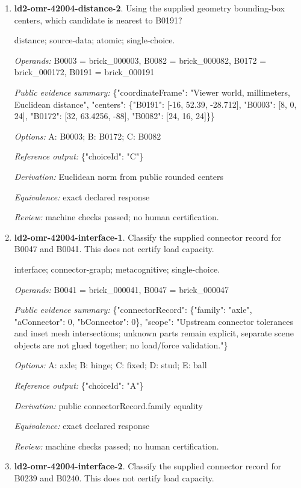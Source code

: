 \begin{enumerate}
\item \textbf{ld2-omr-42004-distance-2}. Using the supplied geometry bounding-box centers, which candidate is nearest to B0191?
\par{\small distance; source-data; atomic; single-choice.\par\textit{Operands:} B0003 = brick\_000003, B0082 = brick\_000082, B0172 = brick\_000172, B0191 = brick\_000191\par\textit{Public evidence summary:} \{"coordinateFrame": "Viewer world, millimeters, Euclidean distance", "centers": \{"B0191": [-16, 52.39, -28.712], "B0003": [8, 0, 24], "B0172": [32, 63.4256, -88], "B0082": [24, 16, 24]\}\}\par\textit{Options:} A: B0003; B: B0172; C: B0082\par\textit{Reference output:} \{"choiceId": "C"\}\par\textit{Derivation:} Euclidean norm from public rounded centers\par\textit{Equivalence:} exact declared response\par\textit{Review:} machine checks passed; no human certification.}
\item \textbf{ld2-omr-42004-interface-1}. Classify the supplied connector record for B0047 and B0041. This does not certify load capacity.
\par{\small interface; connector-graph; metacognitive; single-choice.\par\textit{Operands:} B0041 = brick\_000041, B0047 = brick\_000047\par\textit{Public evidence summary:} \{"connectorRecord": \{"family": "axle", "aConnector": 0, "bConnector": 0\}, "scope": "Upstream connector tolerances and inset mesh intersections; unknown parts remain explicit, separate scene objects are not glued together; no load/force validation."\}\par\textit{Options:} A: axle; B: hinge; C: fixed; D: stud; E: ball\par\textit{Reference output:} \{"choiceId": "A"\}\par\textit{Derivation:} public connectorRecord.family equality\par\textit{Equivalence:} exact declared response\par\textit{Review:} machine checks passed; no human certification.}
\item \textbf{ld2-omr-42004-interface-2}. Classify the supplied connector record for B0239 and B0240. This does not certify load capacity.

\end{enumerate}

